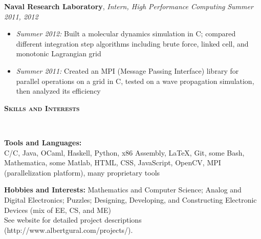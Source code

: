 \documentclass{article}
\newenvironment{changemargin}[2]{%
  \begin{list}{}{%
    \setlength{\topsep}{0pt}%
    \setlength{\leftmargin}{#1}%
    \setlength{\rightmargin}{#2}%
    \setlength{\listparindent}{\parindent}%
    \setlength{\itemindent}{\parindent}%
    \setlength{\parsep}{\parskip}%
  }%
  \item[]}{\end{list}
}
\newcommand{\lineover}{
	\begin{changemargin}{-0.05in}{-0.05in}
		\vspace*{-8pt}
		\hrulefill \\
		\vspace*{-2pt}
	\end{changemargin}
}
\newcommand{\header}[1]{
	\begin{changemargin}{-0.5in}{-0.5in}
		{\large \textbf{\scshape{#1}}}\\
  	\lineover
	\end{changemargin}
}
\newenvironment{body} {
	\vspace*{-16pt}
	\begin{changemargin}{-0.25in}{-0.5in}
  }	
	{\end{changemargin}
}
\newcommand{\CC}{C\nolinebreak\hspace{-.05em}\raisebox{.4ex}{\tiny\bf +}\nolinebreak\hspace{-.10em}\raisebox{.4ex}{\tiny\bf +}}
\begin{document}
\begin{body}
	\textbf{Naval Research Laboratory}, \emph{Intern, High Performance Computing} \hfill \emph{Summer 2011, 2012}\\
	\vspace*{-4pt}
	\begin{itemize}
		\item \emph{Summer 2012:} Built a molecular dynamics simulation in C; compared different integration step algorithms including brute force, linked cell, and monotonic Lagrangian grid
		\item \emph{Summer 2011:} Created an MPI (Message Passing Interface) library for parallel operations on a grid in \CC, tested on a wave propagation simulation, then analyzed its efficiency
	\end{itemize}
\end{body}

\smallskip


\header{Skills and Interests}

\begin{body}
	\vspace{14pt}
	\textbf{Tools and Languages:} \\
	C/\CC, Java, OCaml, Haskell, Python, x86 Assembly, \LaTeX, Git, some Bash, Mathematica, some Matlab, HTML, CSS, JavaScript, OpenCV, MPI (parallelization platform), many proprietary tools \\
	
	\medskip
	
	\textbf{Hobbies and Interests:} Mathematics and Computer Science; Analog and Digital Electronics; Puzzles; Designing, Developing, and Constructing Electronic Devices (mix of EE, CS, and ME) \\ See website for detailed project descriptions (http://www.albertgural.com/projects/). \\
\end{body}

\smallskip
\end{document}
